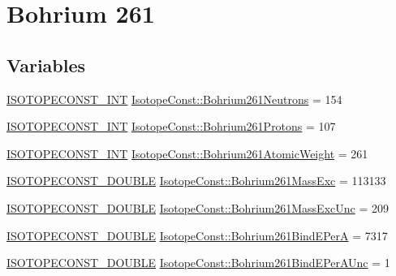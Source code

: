 \hypertarget{group___isotope_const-_bohrium-_bh261}{}\section{Bohrium 261}
\label{group___isotope_const-_bohrium-_bh261}
\subsection*{Variables}
\begin{DoxyCompactItemize}
\item 
\mbox{\hyperlink{group___isotope_const-_macros_ga5f18360b3e99483a35c32d789e62621c}{I\+S\+O\+T\+O\+P\+E\+C\+O\+N\+S\+T\+\_\+\+I\+NT}} \mbox{\hyperlink{group___isotope_const-_bohrium-_bh261_ga21d69d2935e6b73b3c6c38265e8fb2b4}{Isotope\+Const\+::\+Bohrium261\+Neutrons}} = 154
\item 
\mbox{\hyperlink{group___isotope_const-_macros_ga5f18360b3e99483a35c32d789e62621c}{I\+S\+O\+T\+O\+P\+E\+C\+O\+N\+S\+T\+\_\+\+I\+NT}} \mbox{\hyperlink{group___isotope_const-_bohrium-_bh261_ga5e3d3224b12b0f7dbc30aa58e7c2544a}{Isotope\+Const\+::\+Bohrium261\+Protons}} = 107
\item 
\mbox{\hyperlink{group___isotope_const-_macros_ga5f18360b3e99483a35c32d789e62621c}{I\+S\+O\+T\+O\+P\+E\+C\+O\+N\+S\+T\+\_\+\+I\+NT}} \mbox{\hyperlink{group___isotope_const-_bohrium-_bh261_ga88854ff01aafb1e55abb52d2f5cabbe4}{Isotope\+Const\+::\+Bohrium261\+Atomic\+Weight}} = 261
\item 
\mbox{\hyperlink{group___isotope_const-_macros_ga8f45a7272ce02c0b4c65c44636ed719a}{I\+S\+O\+T\+O\+P\+E\+C\+O\+N\+S\+T\+\_\+\+D\+O\+U\+B\+LE}} \mbox{\hyperlink{group___isotope_const-_bohrium-_bh261_gad78b695f15affb44a9869b9024ed9f1d}{Isotope\+Const\+::\+Bohrium261\+Mass\+Exc}} = 113133
\item 
\mbox{\hyperlink{group___isotope_const-_macros_ga8f45a7272ce02c0b4c65c44636ed719a}{I\+S\+O\+T\+O\+P\+E\+C\+O\+N\+S\+T\+\_\+\+D\+O\+U\+B\+LE}} \mbox{\hyperlink{group___isotope_const-_bohrium-_bh261_ga161111bf28ca32f6d215053b192af9ba}{Isotope\+Const\+::\+Bohrium261\+Mass\+Exc\+Unc}} = 209
\item 
\mbox{\hyperlink{group___isotope_const-_macros_ga8f45a7272ce02c0b4c65c44636ed719a}{I\+S\+O\+T\+O\+P\+E\+C\+O\+N\+S\+T\+\_\+\+D\+O\+U\+B\+LE}} \mbox{\hyperlink{group___isotope_const-_bohrium-_bh261_gafe118e99397474827e21b5d96323aef2}{Isotope\+Const\+::\+Bohrium261\+Bind\+E\+PerA}} = 7317
\item 
\mbox{\hyperlink{group___isotope_const-_macros_ga8f45a7272ce02c0b4c65c44636ed719a}{I\+S\+O\+T\+O\+P\+E\+C\+O\+N\+S\+T\+\_\+\+D\+O\+U\+B\+LE}} \mbox{\hyperlink{group___isotope_const-_bohrium-_bh261_gaed632290b4234216d0935919873f18ec}{Isotope\+Const\+::\+Bohrium261\+Bind\+E\+Per\+A\+Unc}} = 1

\end{DoxyCompactItemize}
